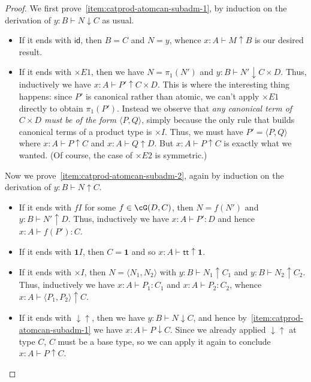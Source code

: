 \documentclass{book}
\def\idfunc{\mathsf{id}}
\let\types\vdash
\newcommand{\atom}{\mathrel{\downarrow}}
\newcommand{\can}{\mathrel{\uparrow}}
\newcommand{\atomcan}{\ensuremath{\mathord{\downarrow\uparrow}}}
\def\unit{\mathbf{1}}
\def\ttt{\mathsf{tt}}
\def\timesE{\ensuremath{\mathord{\times}E}}
\def\timesI{\ensuremath{\mathord{\times}I}}
\def\pair#1#2{\langle #1,#2\rangle}
\begin{document}
\begin{proof}
  We first prove~\ref{item:catprod-atomcan-subadm-1}, by induction on the derivation of $y:B\types N\atom C$ as usual.
  \begin{itemize}
  \item If it ends with $\idfunc$, then $B=C$ and $N=y$, whence $x:A\types M\can B$ is our desired result.
  \item If it ends with $\timesE1$, then we have $N=\pi_1(N')$ and $y:B\types N'\atom C\times D$.
    Thus, inductively we have $x:A\types P'\can C\times D$.
    This is where the interesting thing happens: since $P'$ is canonical rather than atomic, we can't apply $\timesE1$ directly to obtain $\pi_1(P')$.
    Instead we observe that \emph{any canonical term of $C\times D$ must be of the form $\pair PQ$}, simply because the only rule that builds canonical terms of a product type is $\timesI$.
    Thus, we must have $P'=\pair PQ$ where $x:A\types P\can C$ and $x:A\types Q\can D$.
    But $x:A\types P\can C$ is exactly what we wanted.
    (Of course, the case of $\timesE2$ is symmetric.)
  \end{itemize}
  Now we prove~\ref{item:catprod-atomcan-subadm-2}, again by induction on the derivation of $y:B\types N\can C$.
  \begin{itemize}
  \item If it ends with $fI$ for some $f\in\cG(D,C)$, then $N=f(N')$ and $y:B\types N'\can D$.
    Thus, inductively we have $x:A\types P':D$ and hence $x:A\types f(P'):C$.
  \item If it ends with $\unit I$, then $C=\unit$ and so $x:A\types \ttt\can \unit$.
  \item If it ends with $\timesI$, then $N=\pair{N_1}{N_2}$ with $y:B\types N_1\can C_1$ and $y:B\types N_2\can C_2$.
    Thus, inductively we have $x:A\types P_1:C_1$ and $x:A\types P_2:C_2$, whence $x:A\types \pair{P_1}{P_2}\can C$.
  \item If it ends with $\atomcan$, then we have $y:B\types N\atom C$, and hence by~\ref{item:catprod-atomcan-subadm-1} we have $x:A\types P\atom C$.
    Since we already applied $\atomcan$ at type $C$, $C$ must be a base type, so we can apply it again to conclude $x:A\types P\can C$.\qedhere
  \end{itemize}
\end{proof}
\end{document}
